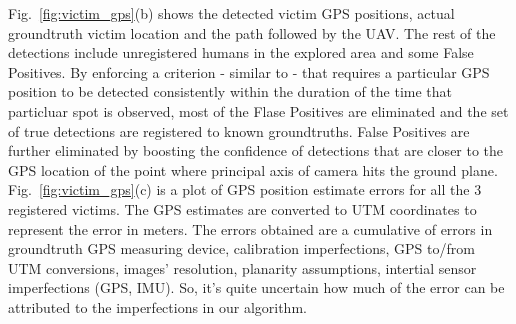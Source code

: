\documentclass[runningheads]{llncs}
\begin{document}
Fig.~\ref{fig:victim_gps}(b) shows the detected victim GPS positions, actual groundtruth victim location and the path followed by the UAV. The rest of the detections include unregistered humans in the explored area and some False Positives. By enforcing a criterion - similar to \cite{rudol2008human} - that requires a particular GPS position to be detected consistently within the duration of the time that particluar spot is observed, most of the Flase Positives are eliminated and the set of true detections are registered to known groundtruths. False Positives are further eliminated by boosting the confidence of detections that are closer to the GPS location of the point where principal axis of camera hits the ground plane. Fig.~\ref{fig:victim_gps}(c) is a plot of GPS position estimate errors for all the 3 registered victims. The GPS estimates are converted to UTM coordinates to represent the error in meters. The errors obtained are a cumulative of errors in groundtruth GPS measuring device, calibration imperfections, GPS to/from UTM conversions, images' resolution, planarity assumptions, intertial sensor imperfections (GPS, IMU). So, it's quite uncertain how much of the error can be attributed to the imperfections in our algorithm.
\end{document}
